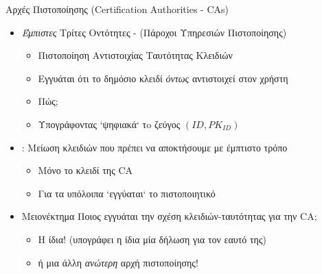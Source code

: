 \documentclass[handout]{beamer}
\begin{document}
\begin{frame}{Αρχές Πιστοποίησης (Certification Authorities - CAs)}
    \begin{itemize}
    \item \emph{Έμπιστες} Τρίτες Οντότητες - (Πάροχοι Υπηρεσιών Πιστοποίησης)
    \pause
    \begin{itemize}
        \item Πιστοποίηση Αντιστοιχίας Ταυτότητας Κλειδιών
        \pause
        \item Εγγυάται ότι το δημόσιο κλειδί \emph{όντως} αντιστοιχεί στον χρήστη
        \pause
        \item Πώς;
        \pause 
        \item Υπογράφοντας `ψηφιακά` τo ζεύγος $(ID, PK_{ID})$        
    \end{itemize}
    \pause
    \item {}: Μείωση κλειδιών που πρέπει να αποκτήσουμε με έμπτιστο τρόπο
    \begin{itemize}
        \item Μόνο το κλειδί της CA
        \item Για τα υπόλοιπα `εγγύαται` το πιστοποιητικό
    \end{itemize}
    \item \alert{Μειονέκτημα} Ποιος εγγυάται την σχέση κλειδιών-ταυτότητας για την CA;
    \begin{itemize}
    \pause
    \item Η ίδια! (υπογράφει η ίδια μία δήλωση για τον εαυτό της)
    \pause
    \item ή μια άλλη \emph{ανώτερη} αρχή πιστοποίησης!
    \end{itemize}
    \end{itemize}
\end{frame}
\end{document}
